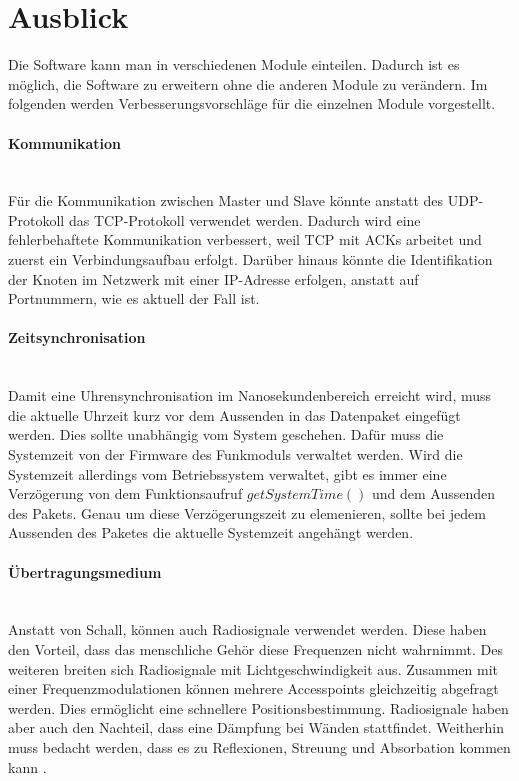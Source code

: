 \newpage

\section{Ausblick}
Die Software kann man in verschiedenen Module einteilen. Dadurch ist es möglich, die Software zu erweitern ohne die anderen Module zu verändern. Im folgenden werden Verbesserungsvorschläge für die einzelnen Module vorgestellt.

\paragraph{Kommunikation}\mbox{}\\
Für die Kommunikation zwischen Master und Slave könnte anstatt des UDP-Protokoll das TCP-Protokoll verwendet werden. Dadurch wird eine fehlerbehaftete Kommunikation verbessert, weil TCP mit ACKs arbeitet und zuerst ein Verbindungsaufbau erfolgt. Darüber hinaus könnte die Identifikation der Knoten im Netzwerk mit einer IP-Adresse erfolgen, anstatt auf Portnummern, wie es aktuell der Fall ist.

\paragraph{Zeitsynchronisation}\mbox{}\\
Damit eine Uhrensynchronisation im Nanosekundenbereich erreicht wird, muss die aktuelle Uhrzeit kurz vor dem Aussenden in das Datenpaket eingefügt werden. Dies sollte unabhängig vom System geschehen. Dafür muss die Systemzeit von der Firmware des Funkmoduls verwaltet werden. Wird die Systemzeit allerdings vom Betriebssystem verwaltet, gibt es immer eine Verzögerung von dem Funktionsaufruf $getSystemTime()$ und dem Aussenden des Pakets. Genau um diese Verzögerungszeit zu elemenieren, sollte bei jedem Aussenden des Paketes die aktuelle Systemzeit angehängt werden.

\paragraph{Übertragungsmedium}\mbox{}\\
Anstatt von Schall, können auch Radiosignale verwendet werden. Diese haben den Vorteil, dass das menschliche Gehör diese Frequenzen nicht wahrnimmt. Des weiteren breiten sich Radiosignale mit Lichtgeschwindigkeit aus. Zusammen mit einer Frequenzmodulationen können mehrere Accesspoints gleichzeitig abgefragt werden. Dies ermöglicht eine schnellere Positionsbestimmung. Radiosignale haben aber auch den Nachteil, dass eine Dämpfung bei Wänden stattfindet. Weitherhin muss bedacht werden, dass es zu Reflexionen, Streuung und Absorbation kommen kann \cite{src_RADIOSIGNALE}.

